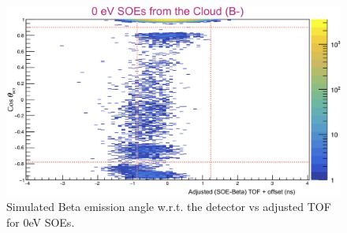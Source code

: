 \begin{figure}[h!tb]
	\centering
	\includegraphics[width=.999\linewidth]
	{Figures/fig_2D_SOE_TOF_0eV.png}
	\caption[Simulated Beta emission angle w.r.t. the detector vs adjusted 0eV SOE TOF]{Simulated Beta emission angle w.r.t. the detector vs adjusted TOF for 0eV SOEs.  %
	}	
	\label{fig:soe_tof_vs_costheta_0eV}
\end{figure}


